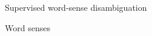\documentclass[10pt, compress]{beamer}
\begin{document}
\begin{frame}[standout]
 
Supervised word-sense disambiguation
 
\end{frame}

\begin{frame}{Word senses}

%
  
\end{frame}










\end{document}
